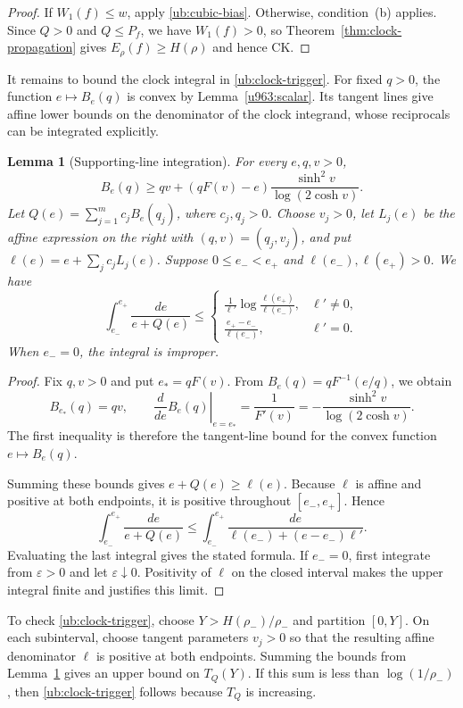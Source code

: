\documentclass[11pt,letterpaper]{amsart}
\newcommand{\1}{\mathbf 1}
\newtheorem{lemma}[theorem]{Lemma}
\numberwithin{equation}{section}
\begin{document}
\begin{proof}
If $W_1(f)\le w$, apply \eqref{ub:cubic-bias}.
Otherwise, condition~(b) applies.
Since $Q>0$ and $Q\le P_f$, we have $W_1(f)>0$,
so Theorem~\ref{thm:clock-propagation} gives
$E_\rho(f)\ge H(\rho)$ and hence CK.
\end{proof}

It remains to bound the clock integral in
\eqref{ub:clock-trigger}.
For fixed $q>0$, the function $e\mapsto B_e(q)$ is convex
by Lemma~\ref{u963:scalar}.
Its tangent lines give affine lower bounds on the denominator
of the clock integrand, whose reciprocals can be integrated
explicitly.

\begin{lemma}[Supporting-line integration]\label{lem:clock-tangent}
For every $e,q,v>0$,
\[
 B_e(q)\ge
 qv+(qF(v)-e)\frac{\sinh^2v}{\log(2\cosh v)}.
\]
Let $Q(e)=\sum_{j=1}^m c_jB_e(q_j)$, where $c_j,q_j>0$.
Choose $v_j>0$, let $L_j(e)$ be the affine expression on the
right with $(q,v)=(q_j,v_j)$, and put
$\ell(e)=e+\sum_jc_jL_j(e)$.
Suppose $0\le e_-<e_+$ and $\ell(e_-),\ell(e_+)>0$.
We have
\[
 \int_{e_-}^{e_+}\frac{de}{e+Q(e)}
 \le
 \begin{cases}
 \displaystyle
 \frac{1}{\ell'}\log\frac{\ell(e_+)}{\ell(e_-)},& \ell'\ne0,\\[6pt]
 \displaystyle
 \frac{e_+-e_-}{\ell(e_-)},&\ell'=0.
 \end{cases}
\]
When $e_-=0$, the integral is improper.
\end{lemma}

\begin{proof}
Fix $q,v>0$ and put $e_*=qF(v)$.
From $B_e(q)=qF^{-1}(e/q)$, we obtain
\[
 B_{e_*}(q)=qv,\qquad
 \left.\frac{d}{de}B_e(q)\right|_{e=e_*}
 =\frac1{F'(v)}
 =-\frac{\sinh^2v}{\log(2\cosh v)}.
\]
The first inequality is therefore the tangent-line bound
for the convex function $e\mapsto B_e(q)$.

Summing these bounds gives $e+Q(e)\ge\ell(e)$.
Because $\ell$ is affine and positive at both endpoints,
it is positive throughout $[e_-,e_+]$.
Hence
\[
 \int_{e_-}^{e_+}\frac{de}{e+Q(e)}
 \le
 \int_{e_-}^{e_+}
       \frac{de}{\ell(e_-)+(e-e_-)\ell'}.
\]
Evaluating the last integral gives the stated formula.
If $e_-=0$, first integrate from $\varepsilon>0$ and let
$\varepsilon\downarrow0$.
Positivity of $\ell$ on the closed interval makes the upper
integral finite and justifies this limit.
\end{proof}

To check \eqref{ub:clock-trigger}, choose
$Y>H(\rho_-)/\rho_-$ and partition $[0,Y]$.
On each subinterval, choose tangent parameters $v_j>0$
so that the resulting affine denominator $\ell$ is positive
at both endpoints.
Summing the bounds from Lemma~\ref{lem:clock-tangent}
gives an upper bound on $T_Q(Y)$.
If this sum is less than $\log(1/\rho_-)$, then
\eqref{ub:clock-trigger} follows because $T_Q$ is increasing.
\end{document}
